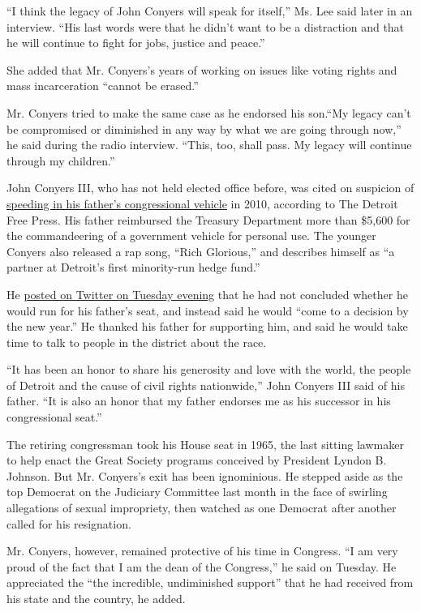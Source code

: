 ``I think the legacy of John Conyers will speak for itself,'' Ms. Lee
said later in an interview. ``His last words were that he didn't want to
be a distraction and that he will continue to fight for jobs, justice
and peace.''

She added that Mr. Conyers's years of working on issues like voting
rights and mass incarceration ``cannot be erased.''

Mr. Conyers tried to make the same case as he endorsed his son.``My
legacy can't be compromised or diminished in any way by what we are
going through now,'' he said during the radio interview. ``This, too,
shall pass. My legacy will continue through my children.''

John Conyers III, who has not held elected office before, was cited on
suspicion of
\href{http://www.mlive.com/news/detroit/index.ssf/2010/12/john_conyers_iii_previously_bu.html}{speeding
in his father's congressional vehicle} in 2010, according to The Detroit
Free Press. His father reimbursed the Treasury Department more than
\$5,600 for the commandeering of a government vehicle for personal use.
The younger Conyers also released a rap song, ``Rich Glorious,'' and
describes himself as ``a partner at Detroit's first minority-run hedge
fund.''

He \href{https://twitter.com/MRCONYERS/status/938194034979430410}{posted
on Twitter on Tuesday evening} that he had not concluded whether he
would run for his father's seat, and instead said he would ``come to a
decision by the new year.'' He thanked his father for supporting him,
and said he would take time to talk to people in the district about the
race.

``It has been an honor to share his generosity and love with the world,
the people of Detroit and the cause of civil rights nationwide,'' John
Conyers III said of his father. ``It is also an honor that my father
endorses me as his successor in his congressional seat.''

The retiring congressman took his House seat in 1965, the last sitting
lawmaker to help enact the Great Society programs conceived by President
Lyndon B. Johnson. But Mr. Conyers's exit has been ignominious. He
stepped aside as the top Democrat on the Judiciary Committee last month
in the face of swirling allegations of sexual impropriety, then watched
as one Democrat after another called for his resignation.

Mr. Conyers, however, remained protective of his time in Congress. ``I
am very proud of the fact that I am the dean of the Congress,'' he said
on Tuesday. He appreciated the ``the incredible, undiminished support''
that he had received from his state and the country, he added.

